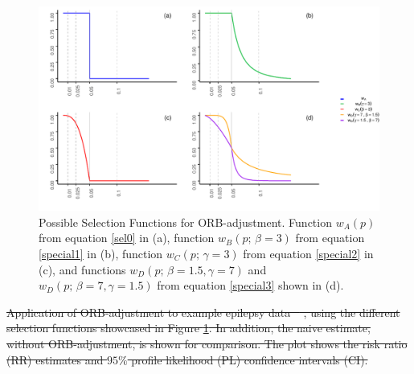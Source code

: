 \documentclass[twocolumn]{article}\usepackage[]{graphicx}\usepackage[]{xcolor}
\makeatletter
\def\maxwidth{ %
  \ifdim\Gin@nat@width>\linewidth
    \linewidth
  \else
    \Gin@nat@width
  \fi
}
\providecommand{\DIFdeltex}[1]{{\protect\color{red}\sout{#1}}}                      %
\providecommand{\DIFaddend}{} %
\providecommand{\DIFdelbegin}{} %
\providecommand{\DIFdelFL}[1]{\DIFdel{#1}} %
\providecommand{\DIFdelendFL}{} %
\providecommand{\DIFdel}[1]{\texorpdfstring{\DIFdeltex{#1}}{}} %
\newcommand{\DIFscaledelfig}{0.5}
\newlength{\DIFdelgraphicswidth} %
\newlength{\DIFdelgraphicsheight} %
\newcommand{\DIFdelincludegraphics}[2][]{%
\sbox{\DIFdelgraphicsbox}{\DIFOincludegraphics[#1]{#2}}%
\settoboxwidth{\DIFdelgraphicswidth}{\DIFdelgraphicsbox} %
\settoboxtotalheight{\DIFdelgraphicsheight}{\DIFdelgraphicsbox} %
\scalebox{\DIFscaledelfig}{%
\parbox[b]{\DIFdelgraphicswidth}{\usebox{\DIFdelgraphicsbox}\\[-\baselineskip] \rule{\DIFdelgraphicswidth}{0em}}\llap{\resizebox{\DIFdelgraphicswidth}{\DIFdelgraphicsheight}{%
\setlength{\unitlength}{\DIFdelgraphicswidth}%
\begin{picture}(1,1)%
\thicklines\linethickness{2pt} %
{\color[rgb]{1,0,0}\put(0,0){\framebox(1,1){}}}%
{\color[rgb]{1,0,0}\put(0,0){\line( 1,1){1}}}%
{\color[rgb]{1,0,0}\put(0,1){\line(1,-1){1}}}%
\end{picture}%
}\hspace*{3pt}}} %
} %
\DeclareRobustCommand{\DIFaddend}{\DIFOaddend \let\includegraphics\DIFOincludegraphics} %
\DeclareRobustCommand{\DIFdelbegin}{\DIFOdelbegin \let\includegraphics\DIFdelincludegraphics} %
\DeclareRobustCommand{\DIFdelendFL}{\DIFOaddendFL \let\includegraphics\DIFOincludegraphics} %
\makeatother
\begin{document}
\DIFaddend %
\begin{figure}[!hbt]
\centering
\caption{Possible Selection Functions for ORB-adjustment. Function $w_A(p)$ from equation \eqref{sel0} in (a), function $w_B(p \text{; } \beta = 3)$ from equation \eqref{special1} in (b), function $w_C(p \text{; } \gamma = 3)$ from equation \eqref{special2} in (c), and functions $w_D(p \text{; } \beta = 1.5, \gamma = 7)$ and $w_D(p \text{; } \beta = 7, \gamma = 1.5)$  from equation \eqref{special3} shown in (d).\\[0.5em]}


{\centering \includegraphics[width=\maxwidth]{figures/plots-unnamed-chunk-1-1} 

}



\label{new.weight.fig}
\end{figure}













\DIFdelbegin %
{%
\DIFdelFL{Application of ORB-adjustment to example epilepsy data \mbox{%
\citep{Copas2019, topiramate}}\hskip0pt%
, using the different selection functions showcased in Figure \ref{new.weight.fig}. In addition, the naive estimate, without ORB-adjustment, is shown for comparison. The plot shows the risk ratio (RR) estimates and $95\%$ profile likelihood (PL) confidence intervals (CI).}}
\DIFdelendFL %
\end{document}
